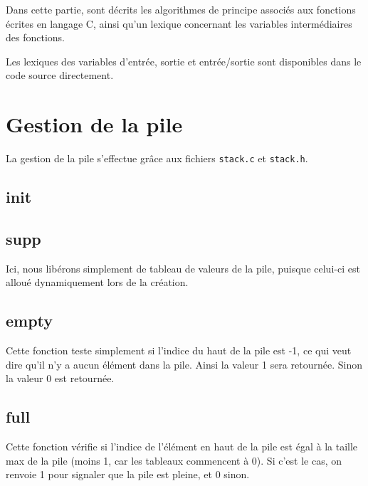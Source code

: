 Dans cette partie, sont décrits les algorithmes de principe associés aux fonctions écrites en langage C, ainsi qu'un lexique concernant les variables intermédiaires des fonctions.

Les lexiques des variables d'entrée, sortie et entrée/sortie sont disponibles dans le code source directement.

\section{Gestion de la pile}
  La gestion de la pile s'effectue grâce aux fichiers \texttt{stack.c} et \texttt{stack.h}.
  
  \subsection{init}
      \begin{algo}[informal] %
      \BEGIN
        \ENDIF
      \END
    \end{algo}

    \begin{algo}[informal] %
      \VAR
      \ENDVAR
    \end{algo}

  \subsection{supp}
    Ici, nous libérons simplement de tableau de valeurs de la pile, puisque celui-ci est alloué dynamiquement lors de la création.
  
  \subsection{empty}
    Cette fonction teste simplement si l'indice du haut de la pile est -1, ce qui veut dire qu'il n'y a aucun élément dans la pile. Ainsi la valeur 1 sera retournée. Sinon la valeur 0 est retournée.
  
  \subsection{full}
    Cette fonction vérifie si l'indice de l'élément en haut de la pile est égal à la taille max de la pile (moins 1, car les tableaux commencent à 0). Si c'est le cas, on renvoie 1 pour signaler que la pile est pleine, et 0 sinon.
  
